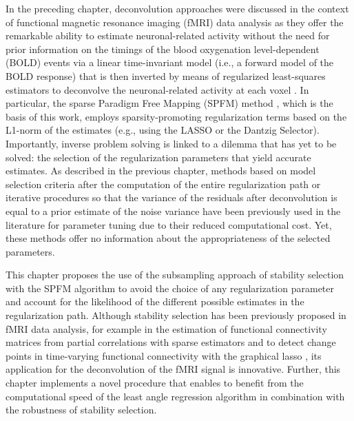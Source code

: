In the preceding chapter, deconvolution approaches were discussed in the context
of functional magnetic resonance imaging (fMRI) data analysis as they offer the
remarkable ability to estimate neuronal-related activity without the need for
prior information on the timings of the blood oxygenation level-dependent (BOLD)
events via a linear time-invariant model (i.e., a forward model of the BOLD
response) that is then inverted by means of regularized least-squares estimators
to deconvolve the neuronal-related activity at each voxel
\citep{Gitelman2003Modelingregionalpsychophysiologic,Khalidov2011ActiveletsWaveletssparse,Karahanoglu2013TotalactivationfMRI,HernandezGarcia2011Neuronaleventdetection,Gaudes2010Detectioncharacterizationsingle,Gaudes2013Paradigmfreemapping}.
In particular, the sparse Paradigm Free Mapping (SPFM) method
\citep{Gaudes2013Paradigmfreemapping}, which is the basis of this work, employs
sparsity-promoting regularization terms based on the L1-norm of the estimates
(e.g., using the LASSO or the Dantzig Selector). Importantly, inverse problem
solving is linked to a dilemma that has yet to be solved: the selection of the
regularization parameters that yield accurate estimates. As described in the
previous chapter,  methods based on model selection criteria after the
computation of the entire regularization path
\citep{Gaudes2013Paradigmfreemapping} or iterative procedures so that the
variance of the residuals after deconvolution is equal to a prior estimate of
the noise variance \citep{Karahanoglu2013TotalactivationfMRI} have been
previously used in the literature for parameter tuning due to their reduced
computational cost. Yet, these methods offer no information about the
appropriateness of the selected parameters.

This chapter proposes the use of the subsampling approach of stability selection
\citep{Meinshausen2010Stabilityselection} with the SPFM algorithm
\citep{Gaudes2013Paradigmfreemapping} to avoid the choice of any regularization
parameter and account for the likelihood of the different possible estimates in
the regularization path. Although stability selection has been previously
proposed in fMRI data analysis, for example in the estimation of functional
connectivity matrices from partial correlations with sparse estimators
\citep{Ryali2012Estimationfunctionalconnectivity} and to detect change points in
time-varying functional connectivity with the graphical lasso
\citep{Cribben2013Detectingfunctionalconnectivity}, its application for the
deconvolution of the fMRI signal is innovative. Further, this chapter implements
a novel procedure that enables to benefit from the computational speed of the
least angle regression algorithm \citep{Efron2004Leastangleregression} in
combination with the robustness of stability selection. 


